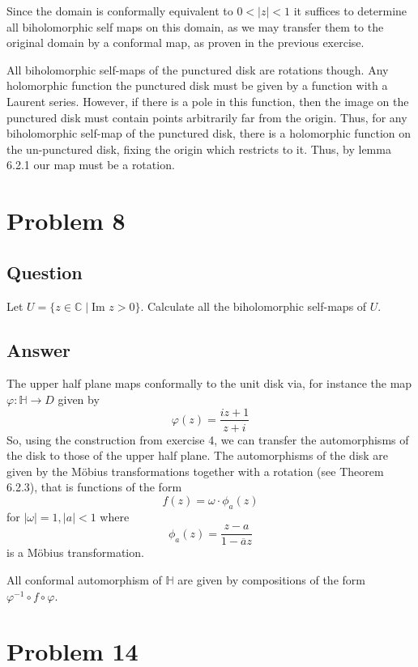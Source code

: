 \documentclass[11pt]{article}
\begin{document}
Since the domain is conformally equivalent to $0 < |z| <1$ it suffices to determine all biholomorphic self maps on this domain, as we may transfer them to the original domain by a conformal map, as proven in the previous exercise. 

All biholomorphic self-maps of the punctured disk are rotations though. Any holomorphic function the punctured disk must be given by a function with a Laurent series. However, if there is a pole in this function, then the image on the punctured disk must contain points arbitrarily far from the origin. Thus, for any biholomorphic self-map of the punctured disk, there is a holomorphic function on the un-punctured disk, fixing the origin which restricts to it. Thus, by lemma 6.2.1 our map must be a rotation.

\section{Problem 8}
\subsection{Question}
Let $U = \{z \in \mathbb{C} \mid \mbox{Im } z >0\}$. Calculate all the biholomorphic self-maps of $U$.
\subsection{Answer}
The upper half plane maps conformally to the unit disk via, for instance the map $\varphi : \mathbb{H} \to D$ given by
\[ \varphi(z) = \frac{i z + 1 }{ z + i} \]
So, using the construction from exercise 4, we can transfer the automorphisms of the disk to those of the upper half plane. The automorphisms of the disk are given by the M\"{o}bius transformations together with a rotation (see Theorem 6.2.3), that is functions of the form
\[ f(z) = \omega \cdot \phi_a(z)\]
for $|\omega| = 1, |a| <1$
where 
\[\phi_a(z) = \frac{z-a}{1-\overline{a} z}\]
is a M\"{o}bius transformation.


All conformal automorphism of $\mathbb{H}$ are given by compositions of the form $\varphi ^{-1} \circ  f \circ \varphi$.


\section{Problem 14}
\end{document}
